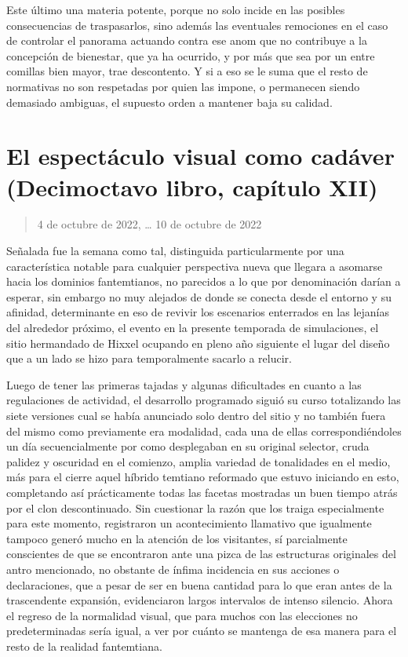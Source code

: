 \documentclass[
]{book}
\begin{document}
Este último una materia potente, porque no solo incide en las posibles consecuencias de traspasarlos, sino además las eventuales remociones en el caso de controlar el panorama actuando contra ese anom que no contribuye a la concepción de bienestar, que ya ha ocurrido, y por más que sea por un entre comillas bien mayor, trae descontento. Y si a eso se le suma que el resto de normativas no son respetadas por quien las impone, o permanecen siendo demasiado ambiguas, el supuesto orden a mantener baja su calidad.

\hypertarget{el-espectuxe1culo-visual-como-caduxe1ver-decimoctavo-libro-capuxedtulo-xii}{%
\section{El espectáculo visual como cadáver (Decimoctavo libro, capítulo XII)}\label{el-espectuxe1culo-visual-como-caduxe1ver-decimoctavo-libro-capuxedtulo-xii}}

\begin{quote}
4 de octubre de 2022, \ldots{} 10 de octubre de 2022
\end{quote}

Señalada fue la semana como tal, distinguida particularmente por una característica notable para cualquier perspectiva nueva que llegara a asomarse hacia los dominios fantemtianos, no parecidos a lo que por denominación darían a esperar, sin embargo no muy alejados de donde se conecta desde el entorno y su afinidad, determinante en eso de revivir los escenarios enterrados en las lejanías del alrededor próximo, el evento en la presente temporada de simulaciones, el sitio hermandado de Hixxel ocupando en pleno año siguiente el lugar del diseño que a un lado se hizo para temporalmente sacarlo a relucir.

Luego de tener las primeras tajadas y algunas dificultades en cuanto a las regulaciones de actividad, el desarrollo programado siguió su curso totalizando las siete versiones cual se había anunciado solo dentro del sitio y no también fuera del mismo como previamente era modalidad, cada una de ellas correspondiéndoles un día secuencialmente por como desplegaban en su original selector, cruda palidez y oscuridad en el comienzo, amplia variedad de tonalidades en el medio, más para el cierre aquel híbrido temtiano reformado que estuvo iniciando en esto, completando así prácticamente todas las facetas mostradas un buen tiempo atrás por el clon descontinuado. Sin cuestionar la razón que los traiga especialmente para este momento, registraron un acontecimiento llamativo que igualmente tampoco generó mucho en la atención de los visitantes, sí parcialmente conscientes de que se encontraron ante una pizca de las estructuras originales del antro mencionado, no obstante de ínfima incidencia en sus acciones o declaraciones, que a pesar de ser en buena cantidad para lo que eran antes de la trascendente expansión, evidenciaron largos intervalos de intenso silencio. Ahora el regreso de la normalidad visual, que para muchos con las elecciones no predeterminadas sería igual, a ver por cuánto se mantenga de esa manera para el resto de la realidad fantemtiana.
\end{document}
